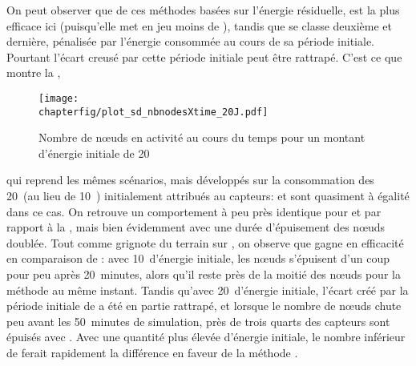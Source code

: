 On peut observer que de ces méthodes basées sur l'énergie résiduelle, \iddems est la plus efficace ici (puisqu'elle met en jeu moins de \cns), tandis que \ideres se classe deuxième et \iddemx dernière, pénalisée par l'énergie consommée au cours de sa période initiale.
Pourtant l'écart creusé par cette période initiale peut être rattrapé.
C'est ce que montre la ,
\begin{figure}[!t]
    \centering
    \texttt{[image: \\chapterfig/plot\_sd\_nbnodesXtime\_20J.pdf]}
    \caption{Nombre de nœuds en activité au cours du temps pour un montant d'énergie initiale de 20~\joule}\label{sd:fig:nbnodes-20J}
\end{figure}
qui reprend les mêmes scénarios, mais développés sur la consommation des 20~\joule (au lieu de 10~\joule) initialement attribués au capteurs: \iddemx et \ideres sont quasiment à égalité dans ce cas.
On retrouve un comportement à peu près identique pour \idstat et \idrand par rapport à la , mais bien évidemment avec une durée d'épuisement des nœuds doublée.
Tout comme \iddemx grignote du terrain sur \ideres, on observe que \iddems gagne en efficacité en comparaison de \idrand: avec 10~\joule d'énergie initiale, les nœuds s'épuisent d'un coup pour \iddems peu après 20~minutes, alors qu'il reste près de la moitié des nœuds pour la méthode \idrand au même instant.
Tandis qu'avec 20~\joule d'énergie initiale, l'écart créé par la période initiale de \iddems a été en partie rattrapé, et lorsque le nombre de nœuds chute peu avant les 50~minutes de simulation, près de trois quarts des capteurs sont épuisés avec \idrand.
Avec une quantité plus élevée d'énergie initiale, le nombre inférieur de \cns ferait rapidement la différence en faveur de la méthode \iddems.

